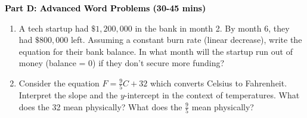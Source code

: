 \documentclass[12pt, letterpaper, fleqn]{article}
\begin{document}
\newpage

\begin{tcolorbox}[colback=customteal!20]
\large\textcolor{black}{\textbf{Part D: Advanced Word Problems (30-45 mins)}}
\end{tcolorbox}

\vspace{3mm}

\begin{enumerate}[itemsep=5.5cm, leftmargin=0.6cm, resume]
\item A tech startup had $\$1,200,000$ in the bank in month 2. By month 6, they had $\$800,000$ left. Assuming a constant burn rate (linear decrease), write the equation for their bank balance. In what month will the startup run out of money (balance = 0) if they don't secure more funding?
\item Consider the equation $F = \frac{9}{5}C + 32$ which converts Celsius to Fahrenheit. Interpret the slope and the $y$-intercept in the context of temperatures. What does the 32 mean physically? What does the $\frac{9}{5}$ mean physically?
\end{enumerate}
\end{document}
